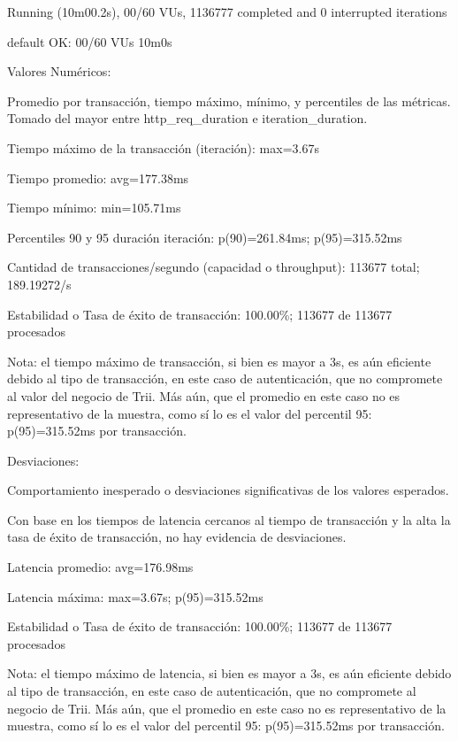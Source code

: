 \documentclass[
  paper=a4,
  ,captions=tableheading
]{scrartcl}
\renewenvironment{quote}{\begin{customblockquote}\list{}{\rightmargin=0em\leftmargin=0em}%
\item\relax\color{blockquote-text}\ignorespaces}{\unskip\unskip\endlist\end{customblockquote}}
\begin{document}
\begin{quote}
Running (10m00.2s), 00/60 VUs, 1136777 completed and 0 interrupted
iterations

default OK: 00/60 VUs 10m0s
\end{quote}

Valores Numéricos:

Promedio por transacción, tiempo máximo, mínimo, y percentiles de las
métricas. Tomado del mayor entre http\_req\_duration e
iteration\_duration.

\begin{quote}
Tiempo máximo de la transacción (iteración): max=3.67s

Tiempo promedio: avg=177.38ms

Tiempo mínimo: min=105.71ms

Percentiles 90 y 95 duración iteración: p(90)=261.84ms; p(95)=315.52ms

Cantidad de transacciones/segundo (capacidad o throughput): 113677
total; 189.19272/s

Estabilidad o Tasa de éxito de transacción: 100.00\%; 113677 de 113677
procesados
\end{quote}

Nota: el tiempo máximo de transacción, si bien es mayor a 3s, es aún
eficiente debido al tipo de transacción, en este caso de autenticación,
que no compromete al valor del negocio de Trii. Más aún, que el promedio
en este caso no es representativo de la muestra, como sí lo es el valor
del percentil 95: p(95)=315.52ms por transacción.

Desviaciones:

Comportamiento inesperado o desviaciones significativas de los valores
esperados.

Con base en los tiempos de latencia cercanos al tiempo de transacción y
la alta la tasa de éxito de transacción, no hay evidencia de
desviaciones.

\begin{quote}
Latencia promedio: avg=176.98ms

Latencia máxima: max=3.67s; p(95)=315.52ms

Estabilidad o Tasa de éxito de transacción: 100.00\%; 113677 de 113677
procesados
\end{quote}

Nota: el tiempo máximo de latencia, si bien es mayor a 3s, es aún
eficiente debido al tipo de transacción, en este caso de autenticación,
que no compromete al negocio de Trii. Más aún, que el promedio en este
caso no es representativo de la muestra, como sí lo es el valor del
percentil 95: p(95)=315.52ms por transacción.
\end{document}
